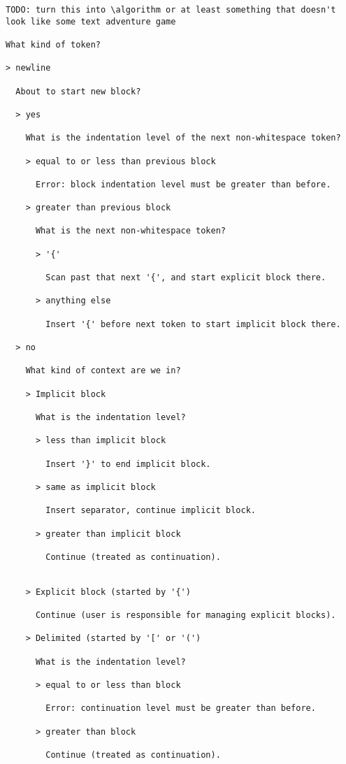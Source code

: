 \documentclass{article}
\begin{document}
\begin{lstlisting}
TODO: turn this into \algorithm or at least something that doesn't look like some text adventure game

What kind of token?

> newline

  About to start new block?

  > yes

    What is the indentation level of the next non-whitespace token?

    > equal to or less than previous block

      Error: block indentation level must be greater than before.

    > greater than previous block

      What is the next non-whitespace token?

      > '{'

        Scan past that next '{', and start explicit block there.

      > anything else

        Insert '{' before next token to start implicit block there.

  > no

    What kind of context are we in?

    > Implicit block

      What is the indentation level?

      > less than implicit block

        Insert '}' to end implicit block.

      > same as implicit block

        Insert separator, continue implicit block.

      > greater than implicit block

        Continue (treated as continuation).


    > Explicit block (started by '{')

      Continue (user is responsible for managing explicit blocks).

    > Delimited (started by '[' or '(')

      What is the indentation level?

      > equal to or less than block

        Error: continuation level must be greater than before.

      > greater than block

        Continue (treated as continuation).


\end{lstlisting}
\end{document}
